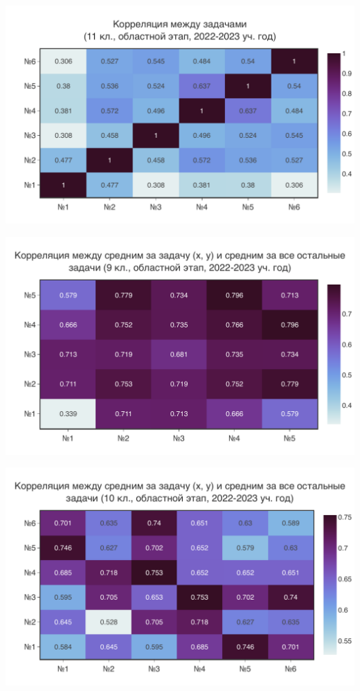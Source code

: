 \includegraphics[width=\linewidth]{../export/pdf/results/2023/oblast/grade11.pdf}

\includegraphics[width=\linewidth]{../export/pdf/results/2023/oblast/grade9-avg.pdf}

\includegraphics[width=\linewidth]{../export/pdf/results/2023/oblast/grade10-avg.pdf}

